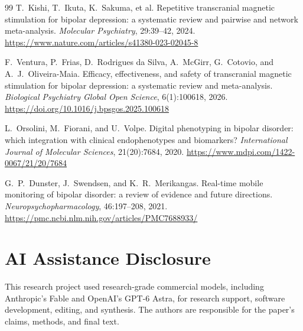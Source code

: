 \documentclass[11pt]{article}
\theoremstyle{remark}
\theoremstyle{plain}
\begin{document}
\begin{thebibliography}{99}
T.\ Kishi, T.\ Ikuta, K.\ Sakuma, et al.
\newblock Repetitive transcranial magnetic stimulation for bipolar depression: a systematic review and pairwise and network meta-analysis.
\newblock \emph{Molecular Psychiatry}, 29:39--42, 2024.
\newblock \url{https://www.nature.com/articles/s41380-023-02045-8}

F.\ Ventura, P.\ Frias, D.\ Rodrigues da Silva, A.\ McGirr, G.\ Cotovio, and A.\ J.\ Oliveira-Maia.
\newblock Efficacy, effectiveness, and safety of transcranial magnetic stimulation for bipolar depression: a systematic review and meta-analysis.
\newblock \emph{Biological Psychiatry Global Open Science}, 6(1):100618, 2026.
\newblock \url{https://doi.org/10.1016/j.bpsgos.2025.100618}

L.\ Orsolini, M.\ Fiorani, and U.\ Volpe.
\newblock Digital phenotyping in bipolar disorder: which integration with clinical endophenotypes and biomarkers?
\newblock \emph{International Journal of Molecular Sciences}, 21(20):7684, 2020.
\newblock \url{https://www.mdpi.com/1422-0067/21/20/7684}

G.\ P.\ Dunster, J.\ Swendsen, and K.\ R.\ Merikangas.
\newblock Real-time mobile monitoring of bipolar disorder: a review of evidence and future directions.
\newblock \emph{Neuropsychopharmacology}, 46:197--208, 2021.
\newblock \url{https://pmc.ncbi.nlm.nih.gov/articles/PMC7688933/}

\end{thebibliography}

\section*{AI Assistance Disclosure}
This research project used research-grade commercial models, including
Anthropic's Fable and OpenAI's GPT-6 Astra, for research support, software
development, editing, and synthesis. The authors are responsible for the
paper's claims, methods, and final text.
\end{document}
